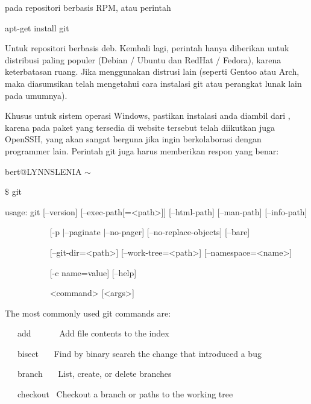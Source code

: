 \vspace{12pt}
\noindent 
pada repositori berbasis RPM, atau perintah \par
\noindent 
{\fontsize{10pt}{10pt}\selectfont apt-get install git} \par
\vspace{12pt}
Untuk repositori berbasis deb. Kembali lagi, perintah hanya diberikan untuk distribusi paling populer (Debian / Ubuntu dan RedHat / Fedora), karena keterbatasan ruang. Jika menggunakan distrusi lain (seperti Gentoo atau Arch, maka diasumsikan telah mengetahui cara instalasi git atau perangkat lunak lain pada umumnya). \par
Khusus untuk sistem operasi Windows, pastikan instalasi anda diambil dari 
, karena pada paket yang tersedia di website tersebut telah diikutkan juga OpenSSH, yang akan sangat berguna jika ingin berkolaborasi dengan programmer lain. Perintah git juga harus memberikan respon yang benar: \par
\noindent 
{\fontsize{10pt}{10pt}\selectfont bert@LYNNSLENIA  $  \sim  $} \par
\noindent 
{\fontsize{10pt}{10pt}\selectfont  $  \$  $ git} \par
\noindent 
{\fontsize{10pt}{10pt}\selectfont usage: git [--version] [--exec-path[=<path>]] [--html-path] [--man-path] [--info-path]} \par
\noindent 
{\fontsize{10pt}{10pt}\selectfont ~~~~~~~~~~ [-p $  \vert  $--paginate $  \vert  $--no-pager] [--no-replace-objects] [--bare]} \par
\noindent 
{\fontsize{10pt}{10pt}\selectfont ~~~~~~~~~~ [--git-dir=<path>] [--work-tree=<path>] [--namespace=<name>]} \par
\noindent 
{\fontsize{10pt}{10pt}\selectfont ~~~~~~~~~~ [-c name=value] [--help]} \par
\noindent 
{\fontsize{10pt}{10pt}\selectfont ~~~~~~~~~~ <command> [<args>]} \par
\noindent 
{\fontsize{10pt}{10pt}\selectfont The most commonly used git commands are:} \par
\noindent 
{\fontsize{10pt}{10pt}\selectfont ~~~add~~~~~~  Add file contents to the index} \par
\noindent 
{\fontsize{10pt}{10pt}\selectfont ~~~bisect~~~  Find by binary search the change that introduced a bug} \par
\noindent 
{\fontsize{10pt}{10pt}\selectfont ~~~branch~~~  List, create, or delete branches} \par
\noindent 
{\fontsize{10pt}{10pt}\selectfont ~~~checkout~  Checkout a branch or paths to the working tree} \par
